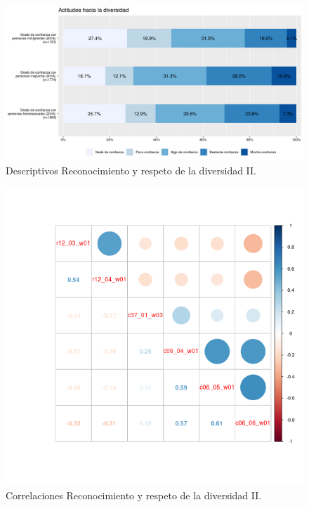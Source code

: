 \documentclass[
  12pt,
]{book}
\begin{document}
\begin{figure}[H]

{\centering \includegraphics[width=1\linewidth,height=1\textheight]{output/graphs/diversidad} 

}

\caption{Descriptivos Reconocimiento y respeto de la diversidad II.}\label{fig:diversidad}
\end{figure}

\begin{figure}[H]

{\centering \includegraphics[width=1\linewidth,height=1\textheight]{output/graphs/diversidad_cor} 

}

\caption{Correlaciones Reconocimiento y respeto de la diversidad II.}\label{fig:diversidad-cor}
\end{figure}
\end{document}
